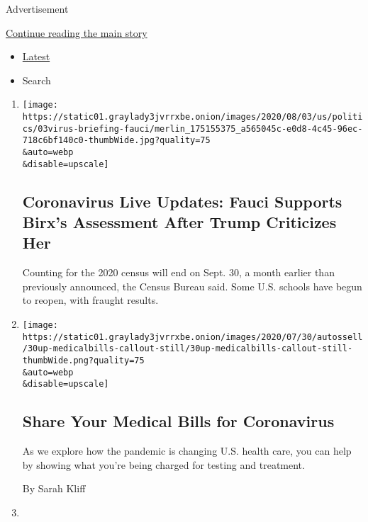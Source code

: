 Advertisement

\protect\hyperlink{after-mid2}{Continue reading the main story}

\begin{itemize}
\tightlist
\item
  \protect\hyperlink{stream-panel}{Latest}
\item
  Search
\end{itemize}

\begin{enumerate}
\def\labelenumi{\arabic{enumi}.}
\item
  \href{/2020/08/03/world/coronavirus-covid-19.html}{}

  \texttt{[image: https://static01.graylady3jvrrxbe.onion/images/2020/08/03/us/politics/03virus-briefing-fauci/merlin\_175155375\_a565045c-e0d8-4c45-96ec-718c6bf140c0-thumbWide.jpg?quality=75\\\&auto=webp\\\&disable=upscale]}

  \hypertarget{coronavirus-live-updates-fauci-supports-birxs-assessment-after-trump-criticizes-her}{%
  \subsection{Coronavirus Live Updates: Fauci Supports Birx's Assessment
  After Trump Criticizes
  Her}\label{coronavirus-live-updates-fauci-supports-birxs-assessment-after-trump-criticizes-her}}

  Counting for the 2020 census will end on Sept. 30, a month earlier
  than previously announced, the Census Bureau said. Some U.S. schools
  have begun to reopen, with fraught results.
\item
  \href{/2020/08/03/reader-center/coronavirus-medical-bills.html}{}

  \texttt{[image: https://static01.graylady3jvrrxbe.onion/images/2020/07/30/autossell/30up-medicalbills-callout-still/30up-medicalbills-callout-still-thumbWide.png?quality=75\\\&auto=webp\\\&disable=upscale]}

  \hypertarget{share-your-medical-bills-for-coronavirus}{%
  \subsection{Share Your Medical Bills for
  Coronavirus}\label{share-your-medical-bills-for-coronavirus}}

  As we explore how the pandemic is changing U.S. health care, you can
  help by showing what you're being charged for testing and treatment.

  By Sarah Kliff
\item
  \href{/2020/08/03/upshot/nj-coronavirus-medical-bill.html}{}


\end{enumerate}
